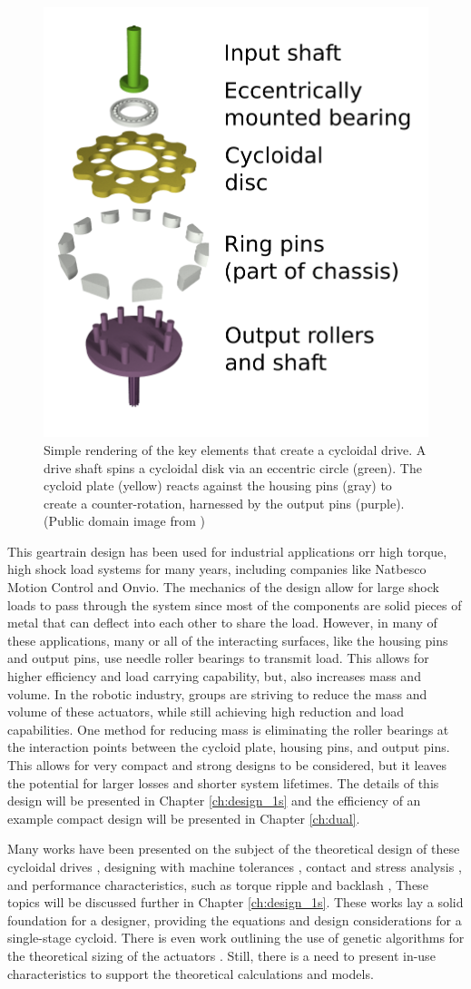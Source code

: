 \begin{figure}[t]
   \centering
   \includegraphics[width=0.40\linewidth]{fig/Cycloidal_drive_parts}
   \caption{Simple rendering of the key elements that create a cycloidal drive.
   A drive shaft spins a cycloidal disk via an eccentric circle (green).
   The cycloid plate (yellow) reacts against the housing pins (gray) to create a counter-rotation, harnessed by the output pins (purple). (Public domain image from \cite{ref:cycloid_cartoon})}
   \label{fig:cycloid_cartoon}
\end{figure}

This geartrain design has been used for industrial applications orr high torque, high shock load systems for many years, including companies like Natbesco Motion Control and Onvio. The mechanics of the design allow for large shock loads to pass through the system since most of the components are solid pieces of metal that can deflect into each other to share the load. 
However, in many of these applications, many or all of the interacting surfaces, like the housing pins and output pins, use needle roller bearings to transmit load.
This allows for higher efficiency and load carrying capability, but, also increases mass and volume.
In the robotic industry, groups are striving to reduce the mass and volume of these actuators, while still achieving high reduction and load capabilities.
One method for reducing mass is eliminating the roller bearings at the interaction points between the cycloid plate, housing pins, and output pins.
This allows for very compact and strong designs to be considered, but it leaves the potential for larger losses and shorter system lifetimes. The details of this design will be presented in Chapter \ref{ch:design_1s} and the efficiency of an example compact design will be presented in Chapter \ref{ch:dual}. 

Many works have been presented on the subject of the theoretical design of these cycloidal drives \cite{ref:on_the_lobe} \cite{ref:hwang_hsieh}, designing with machine tolerances \cite{ref:design_and_application}, contact and stress analysis \cite{ref:li}, and performance characteristics, such as torque ripple and backlash \cite{ref:hsieh_traditional} \cite{ref:hsieh_dynamics}, These topics will be discussed further in Chapter \ref{ch:design_1s}.
These works lay a solid foundation for a designer, providing the equations and design considerations for a single-stage cycloid. There is even work outlining the use of genetic algorithms for the theoretical sizing of the actuators \cite{ref:single_genetic}.
Still, there is a need to present in-use characteristics to support the theoretical calculations and models.


